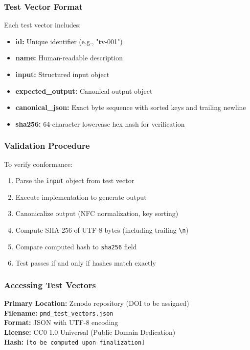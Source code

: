 \documentclass[11pt,a4paper]{article}
\begin{document}
\subsubsection{Test Vector Format}

Each test vector includes:
\begin{itemize}
\item \textbf{id:} Unique identifier (e.g., "tv-001")
\item \textbf{name:} Human-readable description
\item \textbf{input:} Structured input object
\item \textbf{expected\_output:} Canonical output object
\item \textbf{canonical\_json:} Exact byte sequence with sorted keys 
and trailing newline
\item \textbf{sha256:} 64-character lowercase hex hash for verification
\end{itemize}

\subsubsection{Validation Procedure}

To verify conformance:
\begin{enumerate}
\item Parse the \texttt{input} object from test vector
\item Execute implementation to generate output
\item Canonicalize output (NFC normalization, key sorting)
\item Compute SHA-256 of UTF-8 bytes (including trailing \texttt{\textbackslash n})
\item Compare computed hash to \texttt{sha256} field
\item Test passes if and only if hashes match exactly
\end{enumerate}

\subsubsection{Accessing Test Vectors}

\textbf{Primary Location:} Zenodo repository (DOI to be assigned) \\
\textbf{Filename:} \texttt{pmd\_test\_vectors.json} \\
\textbf{Format:} JSON with UTF-8 encoding \\
\textbf{License:} CC0 1.0 Universal (Public Domain Dedication) \\
\textbf{Hash:} \texttt{[to be computed upon finalization]}
\end{document}

